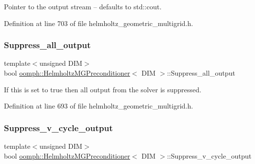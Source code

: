 Pointer to the output stream -- defaults to std\+::cout. 



Definition at line 703 of file helmholtz\+\_\+geometric\+\_\+multigrid.\+h.

\mbox{\label{classoomph_1_1HelmholtzMGPreconditioner_acfa013d5b84d1e611c9c2514aedd71cc}} 
\subsubsection{\texorpdfstring{Suppress\+\_\+all\+\_\+output}{Suppress\_all\_output}}
{\footnotesize\ttfamily template$<$unsigned D\+IM$>$ \\
bool \hyperlink{classoomph_1_1HelmholtzMGPreconditioner}{oomph\+::\+Helmholtz\+M\+G\+Preconditioner}$<$ D\+IM $>$\+::Suppress\+\_\+all\+\_\+output\hspace{0.3cm}{\ttfamily [private]}}



If this is set to true then all output from the solver is suppressed. 



Definition at line 693 of file helmholtz\+\_\+geometric\+\_\+multigrid.\+h.

\mbox{\label{classoomph_1_1HelmholtzMGPreconditioner_a7d2d22a686e109645a7e2fb39f3de704}} 
\subsubsection{\texorpdfstring{Suppress\+\_\+v\+\_\+cycle\+\_\+output}{Suppress\_v\_cycle\_output}}
{\footnotesize\ttfamily template$<$unsigned D\+IM$>$ \\
bool \hyperlink{classoomph_1_1HelmholtzMGPreconditioner}{oomph\+::\+Helmholtz\+M\+G\+Preconditioner}$<$ D\+IM $>$\+::Suppress\+\_\+v\+\_\+cycle\+\_\+output\hspace{0.3cm}{\ttfamily [private]}}



